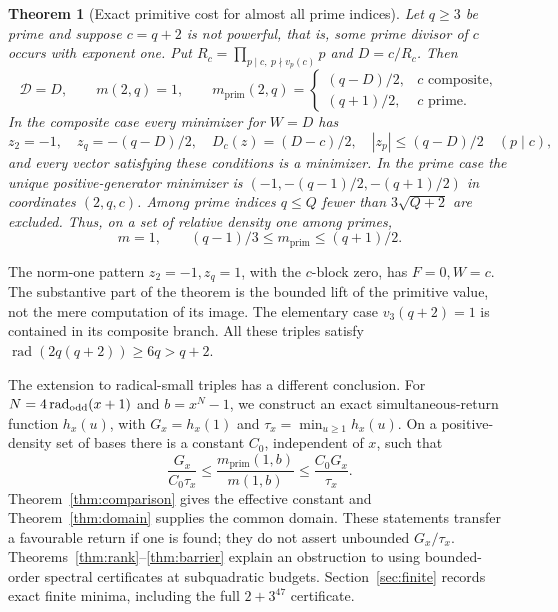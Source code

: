 \documentclass[11pt,a4paper]{article}
\newtheorem{theorem}{Theorem}[section]
\theoremstyle{definition}\newtheorem{question}[theorem]{Question}
\theoremstyle{remark}\newtheorem{remark}[theorem]{Remark}
\newcommand{\Dgen}{\mathcal D}\newcommand{\mpr}{m_{\mathrm{prim}}}
\DeclareMathOperator{\rad}{rad}\DeclareMathOperator{\supp}{supp}
\begin{document}
\begin{theorem}[Exact primitive cost for almost all prime indices]\label{thm:main}
Let $q\ge3$ be prime and suppose $c=q+2$ is not powerful, that is,
some prime divisor of $c$ occurs with exponent one. Put
$R_c=\prod_{p\mid c,\ p\nmid v_p(c)}p$ and $D=c/R_c$. Then
\begin{equation}\label{eq:main}
 \Dgen=D,\qquad m(2,q)=1,\qquad
 \mpr(2,q)=
 \begin{cases}(q-D)/2,&c\text{ composite},\\(q+1)/2,&c\text{ prime}.
 \end{cases}
\end{equation}
In the composite case every minimizer for $W=D$ has
\begin{equation}\label{eq:main-opts}
 z_2=-1,\quad z_q=-(q-D)/2,\quad D_c(z)=(D-c)/2,
 \quad |z_p|\le(q-D)/2\quad(p\mid c),
\end{equation}
and every vector satisfying these conditions is a minimizer. In the
prime case the unique positive-generator minimizer is
$(-1,-(q-1)/2,-(q+1)/2)$ in coordinates $(2,q,c)$.
Among prime indices $q\le Q$ fewer than $3\sqrt{Q+2}$ are excluded.
Thus, on a set of relative density one among primes,
\begin{equation}\label{eq:prime-gap}
 m=1,\qquad (q-1)/3\le\mpr\le(q+1)/2.
\end{equation}
\end{theorem}

The norm-one pattern $z_2=-1,z_q=1$, with the $c$-block zero,
has $F=0,W=c$. The substantive part of the theorem is the bounded
lift of the primitive value, not the mere computation of its image.
The elementary case $v_3(q+2)=1$ is contained in its composite branch.
All these triples satisfy $\rad(2q(q+2))\ge6q>q+2$.

The extension to radical-small triples has a different conclusion.
For $N=4\rad_{\rm odd}(x+1)$ and $b=x^N-1$, we construct an exact
simultaneous-return function $h_x(u)$, with $G_x=h_x(1)$ and
$\tau_x=\min_{u\ge1}h_x(u)$. On a positive-density set of bases
there is a constant $C_0$, independent of $x$, such that
\begin{equation}\label{eq:intro-compare}
 \frac{G_x}{C_0\tau_x}\le\frac{\mpr(1,b)}{m(1,b)}
 \le\frac{C_0G_x}{\tau_x}.
\end{equation}
Theorem~\ref{thm:comparison} gives the effective constant and
Theorem~\ref{thm:domain} supplies the common domain. These statements
transfer a favourable return if one is found; they do not assert
unbounded $G_x/\tau_x$. Theorems~\ref{thm:rank}--\ref{thm:barrier}
explain an obstruction to using bounded-order spectral certificates
at subquadratic budgets. Section~\ref{sec:finite} records exact finite
minima, including the full $2+3^{47}$ certificate.
\end{document}
